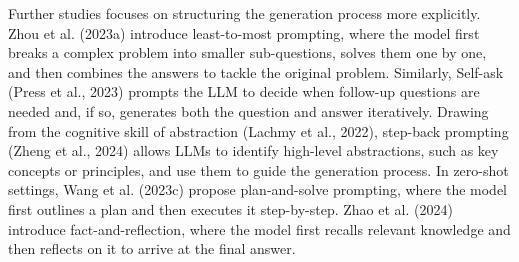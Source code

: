 Further studies focuses on structuring the generation process more explicitly. Zhou et al. (2023a) introduce least-to-most prompting, where the model first breaks a complex problem into smaller sub-questions, solves them one by one, and then combines the answers to tackle the original problem. Similarly, Self-ask (Press et al., 2023) prompts the LLM to decide when follow-up questions are needed and, if so, generates both the question and answer iteratively. Drawing from the cognitive skill of abstraction (Lachmy et al., 2022), step-back prompting (Zheng et al., 2024) allows LLMs to identify high-level abstractions, such as key concepts or principles, and use them to guide the generation process. In zero-shot settings, Wang et al. (2023c) propose plan-and-solve prompting, where the model first outlines a plan and then executes it step-by-step. Zhao et al. (2024) introduce fact-and-reflection, where the model first recalls relevant knowledge and then reflects on it to arrive at the final answer.

